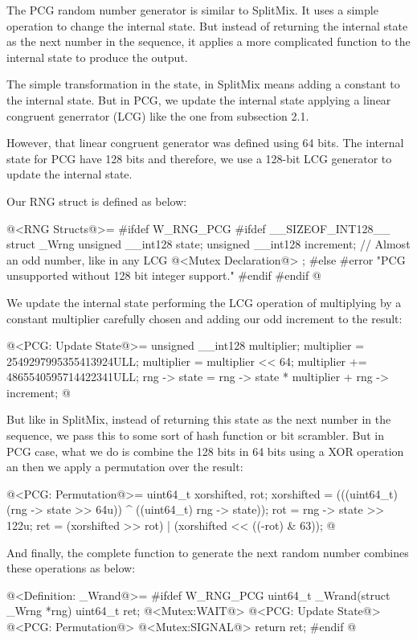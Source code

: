 
The PCG random number generator is similar to SplitMix. It uses a
simple operation to change the internal state. But instead of
returning the internal state as the next number in the sequence, it
applies a more complicated function to the internal state to produce
the output.

The simple transformation in the state, in SplitMix means adding a
constant to the internal state. But in PCG, we update the internal
state applying a linear congruent generrator (LCG) like the one from
subsection 2.1.

However, that linear congruent generator was defined using 64
bits. The internal state for PCG have 128 bits and therefore, we use a
128-bit  LCG generator to update the internal state.

Our RNG struct is defined as below:

\iniciocodigo
@<RNG Structs@>=
#ifdef W_RNG_PCG
#ifdef __SIZEOF_INT128__
struct _Wrng{
  unsigned __int128 state;
  unsigned __int128 increment; // Almost an odd number, like in any LCG
  @<Mutex Declaration@>
};
#else
#error "PCG unsupported without 128 bit integer support."
#endif
#endif
@
\fimcodigo

We update the internal state performing the LCG operation of
multiplying by a constant multiplier carefully chosen and adding our
odd increment to the result:

\iniciocodigo
@<PCG: Update State@>=
{
  unsigned __int128 multiplier;
  multiplier = 2549297995355413924ULL;
  multiplier = multiplier << 64;
  multiplier += 4865540595714422341ULL;
  rng -> state = rng -> state * multiplier + rng -> increment;
}
@
\fimcodigo

But like in SplitMix, instead of returning this state as the next
number in the sequence, we pass this to some sort of hash function or
bit scrambler. But in PCG case, what we do is combine the 128 bits in
64 bits using a XOR operation an then we apply a permutation over the
result:

\iniciocodigo
@<PCG: Permutation@>=
{
  uint64_t xorshifted, rot;
  xorshifted = (((uint64_t)(rng -> state >> 64u)) ^ ((uint64_t) rng -> state));
  rot = rng -> state >> 122u;
  ret = (xorshifted >> rot) | (xorshifted << ((-rot) & 63));
}
@
\fimcodigo

And finally, the complete function to generate the next random number
combines these operations as below:

\iniciocodigo
@<Definition: \_Wrand@>=
#ifdef W_RNG_PCG
uint64_t _Wrand(struct _Wrng *rng){
  uint64_t ret;
  @<Mutex:WAIT@>
  @<PCG: Update State@>
  @<PCG: Permutation@>
  @<Mutex:SIGNAL@>
  return ret;
}
#endif
@
\fimcodigo

